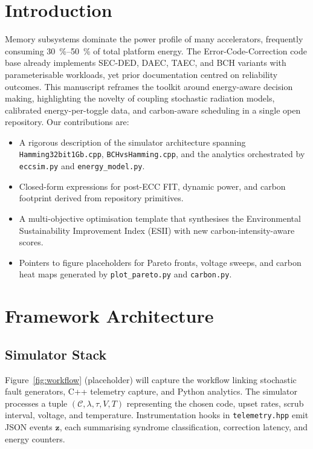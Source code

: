 \documentclass[conference]{IEEEtran}
\begin{document}
\section{Introduction}
Memory subsystems dominate the power profile of many accelerators, frequently consuming \SIrange{30}{50}{\percent} of total platform energy.
The Error-Code-Correction code base already implements SEC-DED, DAEC, TAEC, and BCH variants with parameterisable workloads, yet prior documentation centred on reliability outcomes.
This manuscript reframes the toolkit around energy-aware decision making, highlighting the novelty of coupling stochastic radiation models, calibrated energy-per-toggle data, and carbon-aware scheduling in a single open repository.
Our contributions are:
\begin{itemize}
    \item A rigorous description of the simulator architecture spanning \texttt{Hamming32bit1Gb.cpp}, \texttt{BCHvsHamming.cpp}, and the analytics orchestrated by \texttt{eccsim.py} and \texttt{energy\_model.py}.
    \item Closed-form expressions for post-ECC FIT, dynamic power, and carbon footprint derived from repository primitives.
    \item A multi-objective optimisation template that synthesises the Environmental Sustainability Improvement Index (ESII) with new carbon-intensity-aware scores.
    \item Pointers to figure placeholders for Pareto fronts, voltage sweeps, and carbon heat maps generated by \texttt{plot\_pareto.py} and \texttt{carbon.py}.
\end{itemize}

\section{Framework Architecture}
\subsection{Simulator Stack}
Figure~\ref{fig:workflow} (placeholder) will capture the workflow linking stochastic fault generators, C++ telemetry capture, and Python analytics.
The simulator processes a tuple $(\mathcal{C}, \lambda, \tau, V, T)$ representing the chosen code, upset rates, scrub interval, voltage, and temperature.
Instrumentation hooks in \texttt{telemetry.hpp} emit JSON events $\mathbf{z}$, each summarising syndrome classification, correction latency, and energy counters.
\end{document}
